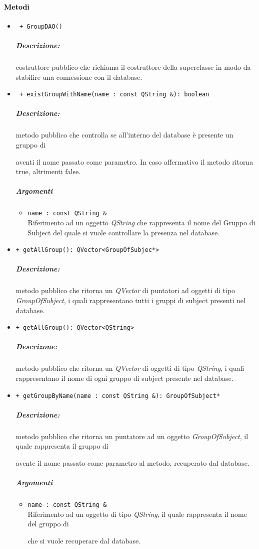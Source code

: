 \paragraph{\textcolor{black}{Metodi\\}}
	\begin{itemize}
		\item \color{blue}\verb! + GroupDAO()!\\
		\color{black}
		\subparagraph{Descrizione:} costruttore pubblico che richiama il costruttore della superclasse in modo da stabilire una connessione con il database. \\
		
		\item \color{blue}\verb! + existGroupWithName(name : const QString &): boolean!
		\color{black} 
		\subparagraph{Descrizione:} metodo pubblico che controlla se all'interno del database è presente un gruppo di \subject{} aventi il nome passato come parametro. In caso affermativo il metodo ritorna true, altrimenti false.\\
		\subparagraph{Argomenti}
			\begin{itemize}
				\item \color{RoyalPurple}\verb!name : const QString &! \\ 
				\color{black}Riferimento ad un oggetto \textsl{QString} che rappresenta il nome del Gruppo di Subject\g{} del quale si vuole controllare la presenza nel database.
			\end{itemize}
	
		\item \color{blue}\verb!+ getAllGroup(): QVector<GroupOfSubjec*>!
		\color{black} 
		\subparagraph{Descrizione:} metodo pubblico che ritorna un \textsl{QVector} di puntatori ad oggetti di tipo \textsl{GroupOfSubject}, i quali rappresentano tutti i gruppi di subject presenti nel database.

		
		\item \color{blue}\verb!+ getAllGroup(): QVector<QString>!
		\color{black} 
		\subparagraph{Descrizone:} metodo pubblico che ritorna un \textsl{QVector} di oggetti di tipo \textsl{QString}, i quali rappresentano il nome di ogni gruppo di subject\g{} presente nel database.
		
		\item \color{blue}\verb!+ getGroupByName(name : const QString &): GroupOfSubject*!
		\color{black} 
		\subparagraph{Descrizione:} metodo pubblico che ritorna un puntatore ad un oggetto \textsl{GroupOfSubject}, il quale rappresenta il gruppo di \subject{} avente il nome passato come parametro al metodo, recuperato dal database.
		\subparagraph{Argomenti}
			\begin{itemize}
				\item \color{RoyalPurple}\verb!name : const QString &! \\ 
				\color{black}
				Riferimento ad un oggetto di tipo \textsl{QString}, il quale rappresenta il nome del gruppo di \subject{} che si vuole recuperare dal database.
			\end{itemize}
			

\end{itemize}
